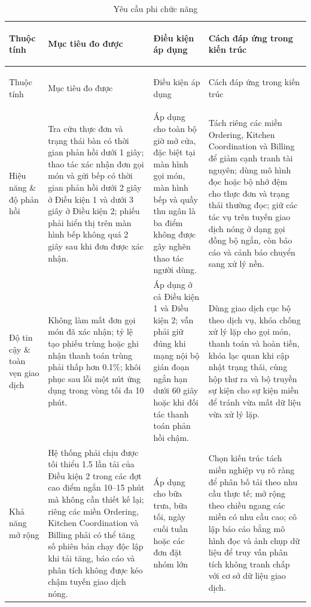 \setlength{\LTleft}{0pt}
\setlength{\LTright}{0pt}
\small
\begin{longtable}{
  >{\bfseries\raggedright\arraybackslash}p{2.8cm}
  >{\raggedright\arraybackslash}p{4.4cm}
  >{\raggedright\arraybackslash}p{3.0cm}
  >{\raggedright\arraybackslash}p{4.2cm}
}
\caption{Yêu cầu phi chức năng}\\
\toprule
Thuộc tính & Mục tiêu đo được & Điều kiện áp dụng & Cách đáp ứng trong kiến trúc \\
\midrule
\endfirsthead
\toprule
Thuộc tính & Mục tiêu đo được & Điều kiện áp dụng & Cách đáp ứng trong kiến trúc \\
\midrule
\endhead
Hiệu năng \& độ phản hồi & Tra cứu thực đơn và trạng thái bàn có thời gian phản hồi dưới 1 giây; thao tác xác nhận đơn gọi món và gửi bếp có thời gian phản hồi dưới 2 giây ở Điều kiện 1 và dưới 3 giây ở Điều kiện 2; phiếu phải hiển thị trên màn hình bếp không quá 2 giây sau khi đơn được xác nhận. & Áp dụng cho toàn bộ giờ mở cửa, đặc biệt tại màn hình gọi món, màn hình bếp và quầy thu ngân là ba điểm không được gây nghẽn thao tác người dùng. & Tách riêng các miền \textsf{Ordering}, \textsf{Kitchen Coordination} và \textsf{Billing} để giảm cạnh tranh tài nguyên; dùng mô hình đọc hoặc bộ nhớ đệm cho thực đơn và trạng thái thường đọc; giữ các tác vụ trên tuyến giao dịch nóng ở dạng gọi đồng bộ ngắn, còn báo cáo và cảnh báo chuyển sang xử lý nền. \\
Độ tin cậy \& toàn vẹn giao dịch & Không làm mất đơn gọi món đã xác nhận; tỷ lệ tạo phiếu trùng hoặc ghi nhận thanh toán trùng phải thấp hơn 0.1\%; khôi phục sau lỗi một nút ứng dụng trong vòng tối đa 10 phút. & Áp dụng ở cả Điều kiện 1 và Điều kiện 2; vẫn phải giữ đúng khi mạng nội bộ gián đoạn ngắn hạn dưới 60 giây hoặc khi đối tác thanh toán phản hồi chậm. & Dùng giao dịch cục bộ theo dịch vụ, khóa chống xử lý lặp cho gọi món, thanh toán và hoàn tiền, khóa lạc quan khi cập nhật trạng thái, cùng hộp thư ra và bộ truyền sự kiện cho sự kiện miền để tránh vừa mất dữ liệu vừa xử lý lặp. \\
Khả năng mở rộng & Hệ thống phải chịu được tối thiểu 1.5 lần tải của Điều kiện 2 trong các đợt cao điểm ngắn 10--15 phút mà không cần thiết kế lại; riêng các miền \textsf{Ordering}, \textsf{Kitchen Coordination} và \textsf{Billing} phải có thể tăng số phiên bản chạy độc lập khi tải tăng, báo cáo và phân tích không được kéo chậm tuyến giao dịch nóng. & Áp dụng cho bữa trưa, bữa tối, ngày cuối tuần hoặc các đơn đặt nhóm lớn & Chọn kiến trúc tách miền nghiệp vụ rõ ràng để phân bố tải theo nhu cầu thực tế; mở rộng theo chiều ngang các miền có nhu cầu cao; cô lập báo cáo bằng mô hình đọc và ảnh chụp dữ liệu để truy vấn phân tích không tranh chấp với cơ sở dữ liệu giao dịch. \\

\end{longtable}
